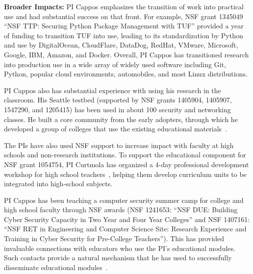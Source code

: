 \textbf{Broader Impacts:} PI Cappos emphasizes the transition of work into practical use and had
substantial success on that front.  For example, NSF
grant 1345049 ``NSF TTP: Securing Python Package Management with TUF''
provided a year of funding to transition TUF into use, leading to its
standardization by Python and use by
DigitalOcean, CloudFlare, DataDog, RedHat, VMware, Microsoft, Google,
IBM, Amazon, and Docker.
Overall, PI Cappos has
transitioned research into production use in a wide array of widely used
software including Git, Python, popular cloud environments, automobiles,
and most Linux distributions.

PI Cappos also has substantial experience with using his research in the
classroom.  His Seattle testbed (supported by NSF grants 1405904,
1405907, 1547290, and 1205415) has been used in about 100
security and networking classes.
He built a core community from the early adopters, through which
he developed a group of colleges that use the existing educational
materials~\cite{NWDCSD}.

The PIs have also used NSF support to increase impact with faculty at high
schools and non-research institutions.
To support the educational component for NSF grant 1054754,
PI Curtmola has organized a 4-day professional development workshop
for high school teachers~\cite{asee14,ccwt14}, helping them
develop curriculum units to be integrated into high-school subjects.

PI Cappos has been teaching a computer
security summer camp for college and high school faculty through NSF
awards (NSF 1241653: ``NSF DUE: Building Cyber Security Capacity in Two Year
and Four Year Colleges'' and NSF 1407161: ``NSF RET in Engineering and
Computer Science Site: Research Experience and Training in Cyber Security for
Pre-College Teachers'').  This has provided invaluable connections with
educators who use the PI's educational modules.  Such contacts provide a
natural mechanism that he has used to successfully disseminate educational
modules~\cite{Cappos_SIGCSE_2014, Hooshangi_SIGCSE_2015}.











